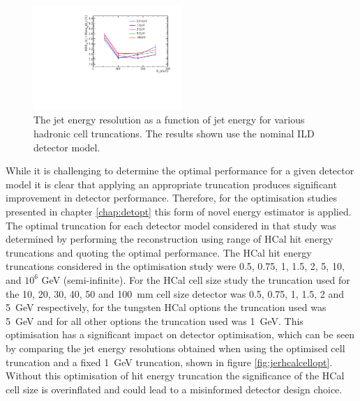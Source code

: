 \begin{figure}[h!]
\includegraphics[width=0.5\textwidth]{EnergyEstimators/Plots/CellTruncation/JER_vs_JetEnergy_HCalCellTruncation.pdf}
\caption[The jet energy resolution as a function of jet energy for various hadronic cell truncations.  The results shown use the nominal ILD detector model.]{The jet energy resolution as a function of jet energy for various hadronic cell truncations.  The results shown use the nominal ILD detector model.}
\label{fig:jercelltrunc}
\end{figure}

While it is challenging to determine the optimal performance for a given detector model it is clear that applying an appropriate truncation produces significant improvement in detector performance.  Therefore, for the optimisation studies presented in chapter \ref{chap:detopt} this form of novel energy estimator is applied.  The optimal truncation for each detector model considered in that study was determined by performing the reconstruction using range of HCal hit energy truncations and quoting the optimal performance.  The HCal hit energy truncations considered in the optimisation study were 0.5, 0.75, 1, 1.5, 2, 5, 10, and $10^{6}$ GeV (semi-infinite).  For the HCal cell size study the truncation used for the 10, 20, 30, 40, 50 and 100~mm cell size detector was 0.5, 0.75, 1, 1.5, 2 and 5~GeV respectively, for the tungsten HCal options the truncation used was 5~GeV and for all other options the truncation used was 1~GeV.  This optimisation has a significant impact on detector optimisation, which can be seen by comparing the jet energy resolutions obtained when using the optimised cell truncation and a fixed 1~GeV truncation, shown in figure \ref{fig:jerhcalcellopt}.  Without this optimisation of hit energy truncation the significance of the HCal cell size is overinflated and could lead to a misinformed detector design choice.  

